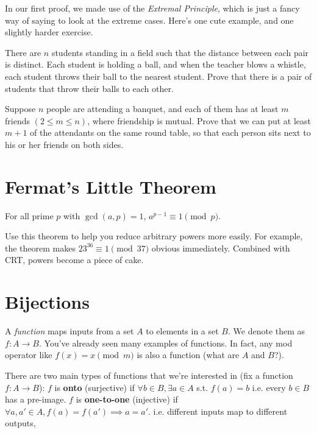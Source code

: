 \documentclass[11 pt]{scrartcl}
\begin{document}
In our first proof, we made use of the \emph{Extremal Principle}, which is just a fancy way of saying to look at the extreme cases. Here's one cute example, and one slightly harder exercise. 

\begin{exercise}
    There are $n$ students standing in a field such that the distance between each pair is distinct. Each student is holding a ball, and when the teacher blows a whistle, each student throws their ball to the nearest student. Prove that there is a pair of students that throw their balls to each other.
\end{exercise}
\begin{exercise}
    Suppose $n$ people are attending a banquet, and each of them has at least $m$
friends $(2 \leq m \leq n)$, where friendship is mutual. Prove that we can put at least $m + 1$ of the attendants on the same round table, so that each person sits next to his or her friends on both sides.
\end{exercise}

\section{Fermat's Little Theorem}
\begin{theorem}
    For all prime $p$ with $\gcd(a,p) = 1$, $a^{p-1} \equiv 1 \pmod{p}$. 
\end{theorem}

Use this theorem to help you reduce arbitrary powers more easily. For example, the theorem makes $23^{36}\equiv 1 \pmod{37}$ obvious immediately. Combined with CRT, powers become a piece of cake. 

\section{Bijections}
A \emph{function} maps inputs from a set $A$ to elements in a set $B$. We denote them as $f: A\to B$. You've already seen many examples of functions. In fact, any mod operator like $f(x) = x\pmod{m}$ is also a function (what are $A$ and $B$?). 

There are two main types of functions that we're interested in (fix a function $f:A\to B$): 
\itemnum
    \ii $f$ is \textbf{onto} (surjective) if $\forall b\in B, \exists a\in A$ s.t. $f(a) = b$
    \itemnum
        \ii i.e. every $b\in B$ has a pre-image.
    \itemend
    \ii $f$ is \textbf{one-to-one} (injective) if $\forall a,a' \in A, f(a) = f(a') \implies a = a'$.
    \itemnum
        \ii i.e. different inputs map to different outputs, 
    \itemend
\itemend
\end{document}
